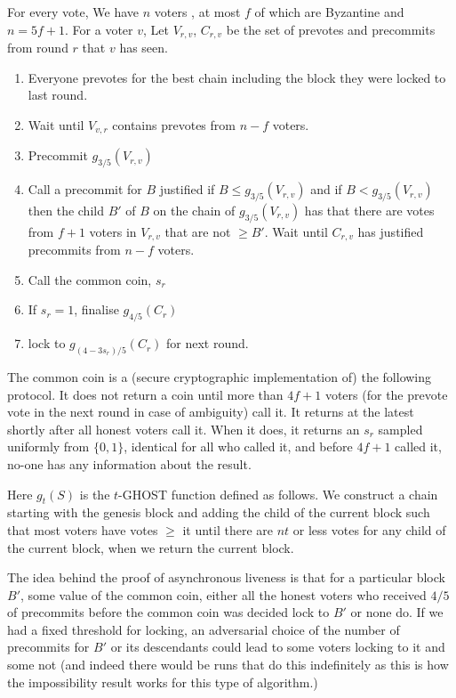 \documentclass{article}
\begin{document}
For every vote, We have $n$ voters , at most $f$ of which are Byzantine and $n = 5f+1$.  For a voter $v$, Let $V_{r,v}$, $C_{r,v}$ be the set of prevotes and precommits from round $r$ that $v$ has seen.

\begin{enumerate}
\item Everyone prevotes for the best chain including the block they were locked to last round.
\item Wait until $V_{v,r}$ contains prevotes from $n-f$ voters.
\item Precommit $g_{3/5}(V_{r,v})$
\item Call a precommit for $B$ justified if $B \leq g_{3/5}(V_{r,v})$ and if $B < g_{3/5}(V_{r,v})$ then the child $B'$ of $B$ on the chain of $g_{3/5}(V_{r,v})$ has that there are votes from $f+1$ voters in $V_{r,v}$ that are not $\geq B'$.
Wait until $C_{r,v}$ has justified precommits from $n-f$ voters. 
\item Call the common coin, $s_r$
\item If $s_r=1$, finalise $g_{4/5}(C_r)$
\item lock to $g_{(4-3s_r)/5}(C_r)$ for next round.
\end{enumerate}

The common coin is a (secure cryptographic implementation of) the following protocol. It does not return a coin until more than $4f+1$ voters (for the prevote vote in the next round in case of ambiguity) call it. It returns at the latest shortly after all honest voters call it.
 When it does, it returns an $s_r$ sampled uniformly from $\{0,1\}$, identical for all who called it, and before $4f+1$ called it, no-one has any information about the result.

Here $g_{t}(S)$ is the $t$-GHOST function defined as follows. We construct a chain starting with the genesis block and adding the child of the current block such that most voters have votes $\geq$ it until there are $nt$ or less votes for any child of the current block, when we return the current block.

The idea behind the proof of asynchronous liveness is that for a particular block $B'$, some value of the common coin, either all the honest voters who received $4/5$ of precommits before the common coin was decided lock to $B'$ or none do.
If we had a fixed threshold for locking, an adversarial choice of the number of precommits for $B'$ or its descendants could lead to some voters locking to it and some not (and indeed there would be runs that do this indefinitely as this is how the impossibility result works for this type of algorithm.)
\end{document}
